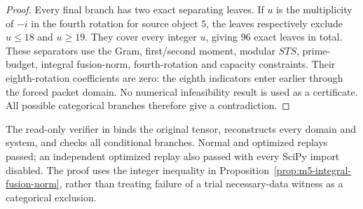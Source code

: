 \begin{proof}
Every final branch has two exact separating leaves. If $u$ is the
multiplicity of $-i$ in the fourth rotation for source object $5$,
the leaves respectively exclude $u\leq18$ and $u\geq19$.
They cover every integer $u$, giving $96$ exact leaves in total.
These separators use the Gram, first/second moment, modular $STS$,
prime-budget, integral fusion-norm, fourth-rotation and capacity
constraints. Their eighth-rotation coefficients are zero: the
eighth indicators enter earlier through the forced packet domain.
No numerical infeasibility result is used as a certificate.
All possible categorical branches therefore give a contradiction.
\end{proof}

The read-only verifier  in
binds the original tensor, reconstructs every domain and system, and
checks all conditional branches. Normal and optimized replays passed;
an independent optimized replay also passed with every SciPy import
disabled. The proof uses the integer inequality in
Proposition~\ref{prop:m5-integral-fusion-norm}, rather than treating
failure of a trial necessary-data witness as a categorical exclusion.
